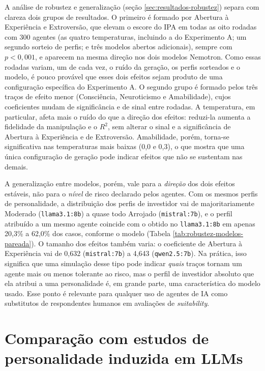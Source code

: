 A análise de robustez e generalização (seção \ref{sec:resultados-robustez})
separa com clareza dois grupos de resultados. O primeiro é formado por
Abertura à Experiência e Extroversão, que elevam o escore do IPA em todas
as oito rodadas com 300 agentes (as quatro temperaturas, incluindo a do
Experimento A; um segundo sorteio de perfis; e três modelos abertos
adicionais), sempre com $p<0{,}001$, e aparecem na mesma direção nos dois
modelos Nemotron.
Como essas rodadas variam, um de cada vez, o ruído da geração, os perfis
sorteados e o modelo, é pouco provável que esses dois efeitos sejam
produto de uma configuração específica do Experimento A. O segundo grupo
é formado pelos três traços de efeito menor (Consciência, Neuroticismo e
Amabilidade), cujos coeficientes mudam de significância e de sinal entre
rodadas. A temperatura, em particular, afeta mais o ruído do que a
direção dos efeitos: reduzi-la aumenta a fidelidade da manipulação e o
$R^2$, sem alterar o sinal e a significância de Abertura à Experiência e
de Extroversão. Amabilidade, porém, torna-se significativa nas
temperaturas mais baixas (0,0 e 0,3), o que mostra que uma única
configuração de geração pode indicar efeitos que não se sustentam nas
demais.

A generalização entre modelos, porém, vale para a \textit{direção} dos
dois efeitos estáveis, não para o \textit{nível} de risco declarado pelos
agentes. Com os mesmos perfis de personalidade, a distribuição dos perfis
de investidor vai de majoritariamente Moderado (\texttt{llama3.1:8b}) a
quase todo Arrojado (\texttt{mistral:7b}), e o perfil atribuído a um
mesmo agente coincide com o obtido no \texttt{llama3.1:8b} em apenas
20,3\% a 62,0\% dos casos, conforme o modelo (Tabela
\ref{tab:robustez-modelos-pareada}). O tamanho dos efeitos também varia:
o coeficiente de Abertura à Experiência vai de 0,632
(\texttt{mistral:7b}) a 4,643 (\texttt{qwen2.5:7b}). Na prática, isso
significa que uma simulação desse tipo pode indicar \textit{quais} traços
tornam um agente mais ou menos tolerante ao risco, mas o perfil de
investidor absoluto que ela atribui a uma personalidade é, em grande
parte, uma característica do modelo usado. Esse ponto é relevante para
qualquer uso de agentes de IA como substitutos de respondentes humanos em
avaliações de \textit{suitability}.

\section{Comparação com estudos de personalidade induzida em LLMs}
\label{sec:discussao-llm}

